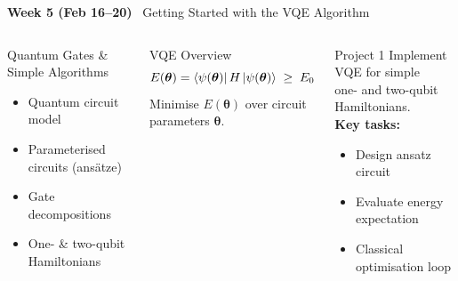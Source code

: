 \documentclass[aspectratio=169,10pt]{beamer}
\newcommand{\week}[1]{\textcolor{blue!60!black}{\textbf{#1}}}
\begin{document}
\begin{frame}{\week{Week 5 (Feb 16--20)} \ Getting Started with the VQE Algorithm}
  \begin{columns}[T]
      \begin{block}{Quantum Gates \& Simple Algorithms}
        \begin{itemize}
          \item Quantum circuit model
          \item Parameterised circuits (ansätze)
          \item Gate decompositions
          \item One- \& two-qubit Hamiltonians
        \end{itemize}
      \end{block}
      \vspace{4pt}
      \begin{block}{VQE Overview}
        \[
          E(\bm{\theta}) = \bra{\psi(\bm{\theta})}H\ket{\psi(\bm{\theta})}
          \;\geq\; E_0
        \]
        Minimise $E(\bm\theta)$ over circuit parameters $\bm\theta$.
      \end{block}
      \begin{alertblock}{Project 1}
        Implement VQE for simple\\
        one- and two-qubit Hamiltonians.\\[4pt]
        \textbf{Key tasks:}
        \begin{itemize}
          \item Design ansatz circuit
          \item Evaluate energy expectation
          \item Classical optimisation loop
        \end{itemize}
      \end{alertblock}
  \end{columns}
\end{frame}
\end{document}
